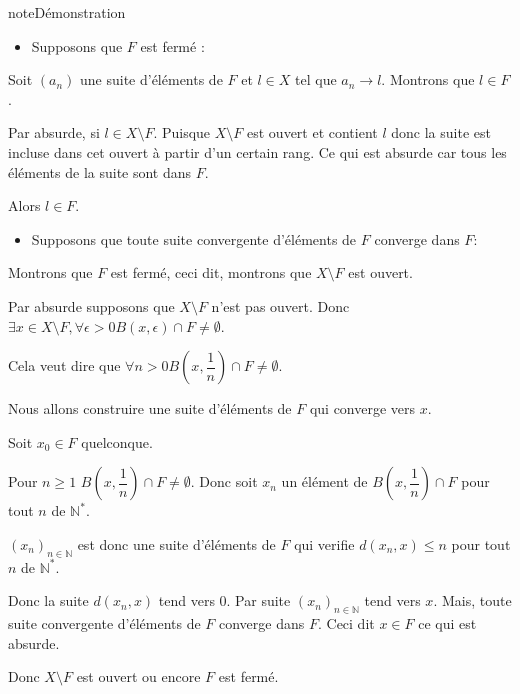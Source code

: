 \documentclass[letterpaper,10pt,french]{sphinxmanual}
\begin{document}
\begin{sphinxadmonition}{note}{Démonstration}
\begin{itemize}
\item {} 
\sphinxAtStartPar
Supposons que \(F\) est fermé :

\end{itemize}

\sphinxAtStartPar
Soit \((a_n)\) une suite d’éléments de \(F\) et \(l\in X\) tel que \(a_n \longrightarrow l\). Montrons que \(l\in F\).

\sphinxAtStartPar
Par absurde, si \(l \in X\setminus F\). Puisque \(X\setminus F\) est ouvert et contient \(l\) donc la suite est incluse dans cet ouvert à partir d’un certain rang. Ce qui est absurde car tous les éléments de la suite sont dans \(F\).

\sphinxAtStartPar
Alors \(l\in F\).
\begin{itemize}
\item {} 
\sphinxAtStartPar
Supposons que toute suite convergente d’éléments de \(F\) converge dans \(F\):

\end{itemize}

\sphinxAtStartPar
Montrons que \(F\) est fermé, ceci dit, montrons que \(X\setminus F\) est ouvert.

\sphinxAtStartPar
Par absurde supposons que  \(X\setminus F\) n’est pas ouvert. Donc \(\exists x \in X\setminus F, \forall \epsilon>0 B(x, \epsilon)\cap F \neq \emptyset\).

\sphinxAtStartPar
Cela veut dire que \(\forall n>0 B(x, \dfrac{1}{n})\cap F \neq \emptyset\).

\sphinxAtStartPar
Nous allons construire une suite d’éléments de \(F\) qui converge vers \(x\).

\sphinxAtStartPar
Soit \(x_0 \in F\) quelconque.

\sphinxAtStartPar
Pour \(n\geq 1\) \(B(x, \dfrac{1}{n})\cap F \neq \emptyset\). Donc soit \(x_n\) un élément de \(B(x, \dfrac{1}{n})\cap F\) pour tout \(n\) de \(\mathbb N^{*}\).

\sphinxAtStartPar
\((x_n)_{n\in \mathbb N}\) est donc une suite d’éléments de \(F\) qui verifie \(d(x_n, x)\leq n\) pour tout \(n\) de \(\mathbb N^{*}\).

\sphinxAtStartPar
Donc la suite \(d(x_n, x)\) tend vers 0. Par suite \((x_n)_{n\in \mathbb N}\) tend vers \(x\). Mais, toute suite convergente d’éléments de \(F\) converge dans \(F\). Ceci dit \(x\in F\) ce qui est absurde.

\sphinxAtStartPar
Donc \(X\setminus F\) est ouvert ou encore \(F\) est fermé.
\end{sphinxadmonition}
\end{document}
